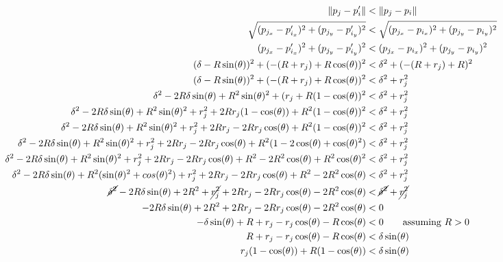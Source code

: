 \documentclass[conference]{IEEEtran}
\begin{document}
    {%
      \setlength{\belowdisplayskip}{3pt}%
      \setlength{\abovedisplayskip}{3pt}%
      \begin{align*}
        \lVert p_j - p'_i \rVert &< \lVert p_j - p_i \rVert \\
        \sqrt{(p_{j_x} - p'_{i_x})^2 + (p_{j_y} - p'_{i_y})^2} &< \sqrt{(p_{j_x} - p_{i_x})^2 + (p_{j_y} - p_{i_y})^2} \\
        (p_{j_x} - p'_{i_x})^2 + (p_{j_y} - p'_{i_y})^2 &< (p_{j_x} - p_{i_x})^2 + (p_{j_y} - p_{i_y})^2 \\
        (\delta - R\sin(\theta))^2 + (-(R+r_j) + R\cos(\theta))^2 &< \delta^2 + (-(R+r_j) + R)^2 \\
        (\delta - R\sin(\theta))^2 + (-(R+r_j) + R\cos(\theta))^2 &< \delta^2 + r_j^2 \\
        \delta^2 - 2R\delta\sin(\theta) + R^2\sin(\theta)^2 + (r_j + R(1 - \cos(\theta))^2 &< \delta^2 + r_j^2 \\
        \delta^2 - 2R\delta\sin(\theta) + R^2\sin(\theta)^2 + r_j^2 + 2Rr_j(1 - \cos(\theta)) + R^2(1 - \cos(\theta))^2 &< \delta^2 + r_j^2 \\
        \delta^2 - 2R\delta\sin(\theta) + R^2\sin(\theta)^2 + r_j^2 + 2Rr_j - 2Rr_j\cos(\theta) + R^2(1 - \cos(\theta))^2 &< \delta^2 + r_j^2 \\
        \delta^2 - 2R\delta\sin(\theta) + R^2\sin(\theta)^2 + r_j^2 + 2Rr_j - 2Rr_j\cos(\theta) + R^2(1 - 2\cos(\theta) + \cos(\theta)^2) &< \delta^2 + r_j^2 \\
        \delta^2 - 2R\delta\sin(\theta) + R^2\sin(\theta)^2 + r_j^2 + 2Rr_j - 2Rr_j\cos(\theta) + R^2 - 2R^2\cos(\theta) + R^2\cos(\theta)^2 &< \delta^2 + r_j^2 \\
        \delta^2 - 2R\delta\sin(\theta) + R^2(\sin(\theta)^2 + cos(\theta)^2) + r_j^2 + 2Rr_j - 2Rr_j\cos(\theta) + R^2 - 2R^2\cos(\theta) &< \delta^2 + r_j^2 \\
        \cancel{\delta^2} - 2R\delta\sin(\theta) + 2R^2 + \cancel{r_j^2} + 2Rr_j - 2Rr_j\cos(\theta) - 2R^2\cos(\theta) &< \cancel{\delta^2} + \cancel{r_j^2} \\
        -2R\delta\sin(\theta) + 2R^2 + 2Rr_j - 2Rr_j\cos(\theta) - 2R^2\cos(\theta) &< 0 \\
        -\delta\sin(\theta) + R + r_j - r_j\cos(\theta) - R\cos(\theta) &< 0 \qquad \text{assuming $R>0$}\\
        R + r_j - r_j\cos(\theta) - R\cos(\theta) &< \delta\sin(\theta) \\
        r_j(1 - \cos(\theta)) + R(1 - \cos(\theta)) &< \delta\sin(\theta) \\

\end{align*}}
\end{document}
